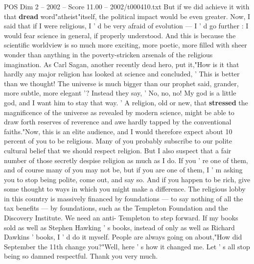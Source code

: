 \begin{textsample}{POS Dim 2 – 2002 – Score 11.00 – 2002/t000410.txt}
But if we did achieve it with that \textbf{dread} word"atheist"itself, the political impact would be even greater.
Now, I said that if I were religious, I ' d be very afraid of evolution — I ' d go further : I would fear science in general, if properly understood.
And this is because the scientific worldview is so much more exciting, more poetic, more filled with sheer wonder than anything in the poverty-stricken arsenals of the religious imagination.
As Carl Sagan, another recently dead hero, put it,"How is it that hardly any major religion has looked at science and concluded, ' This is better than we thought!
The universe is much bigger than our prophet said, grander, more subtle, more elegant '?
Instead they say, ' No, no, no!
My god is a little god, and I want him to stay that way. ' A religion, old or new, that \textbf{stressed} the magnificence of the universe as revealed by modern science, might be able to draw forth reserves of reverence and awe hardly tapped by the conventional faiths."Now, this is an elite audience, and I would therefore expect about 10 percent of you to be religious.
Many of you probably subscribe to our polite cultural belief that we should respect religion.
But I also suspect that a fair number of those secretly despise religion as much as I do.
If you ' re one of them, and of course many of you may not be, but if you are one of them, I ' m asking you to stop being polite, come out, and say so.
And if you happen to be rich, give some thought to ways in which you might make a difference.
The religious lobby in this country is massively financed by foundations — to say nothing of all the tax benefits — by foundations, such as the Templeton Foundation and the Discovery Institute.
We need an anti- Templeton to step forward.
If my books sold as well as Stephen Hawking ' s books, instead of only as well as Richard Dawkins ' books, I ' d do it myself.
People are always going on about,"How did September the 11th change you?"Well, here ' s how it changed me.
Let ' s all stop being so damned respectful.
Thank you very much.

\end{textsample}
